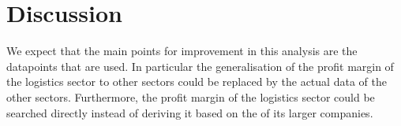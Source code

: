 \section{Discussion}\label{sec:discussion}
We expect that the main points for improvement in this analysis are the datapoints that are used. In particular the generalisation of the profit margin of the logistics sector to other sectors could be replaced by the actual data of the other sectors. Furthermore, the profit margin of the logistics sector could be searched directly instead of deriving it based on the of its larger companies.